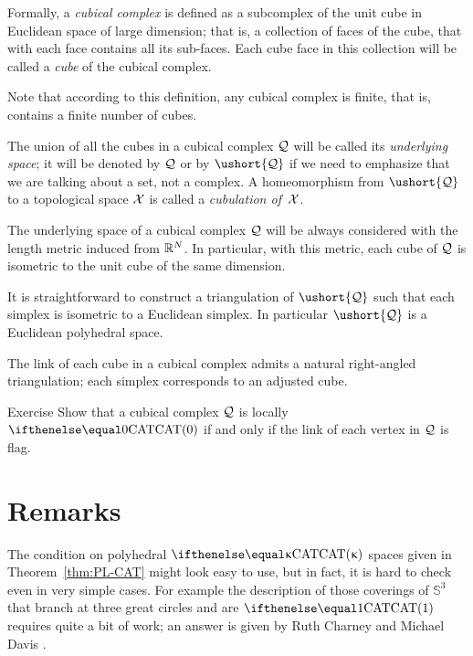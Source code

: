 Formally, a \emph{cubical complex} is defined as a subcomplex 
of the unit cube in Euclidean space of large dimension;
that is, a collection of faces of the cube, that with each face contains all its sub-faces.
Each cube face in this collection 
will be called a {}\emph{cube} of the cubical complex.

Note that according to this definition, 
any cubical complex is finite,
that is, contains a finite number of cubes.

The union of all the cubes in a cubical complex $\mathcal{Q}$ will be called its \emph{underlying space};
it will be denoted by $\mathcal{Q}$ or by $\ushort{\spc{Q}}$ 
if we need to emphasize that we are talking about a set, 
not a complex.
A homeomorphism from $\ushort{\spc{Q}}$ to a topological space $\mathcal{X}$ is called a \emph{cubulation of}~$\mathcal{X}$.

The underlying space of a cubical complex $\mathcal{Q}$ will be always considered with the length metric
induced from $\mathbb{R}^N$.
In particular, with this metric, 
each cube of $\mathcal{Q}$ is isometric to the unit cube of the same dimension.

It is straightforward to construct a triangulation 
of $\ushort{\spc{Q}}$ 
such that each simplex is isometric to a Euclidean simplex.
In particular $\ushort{\spc{Q}}$ is a Euclidean polyhedral space.

The link of each cube in a cubical complex admits a natural right-angled triangulation; 
each simplex corresponds to an adjusted cube.

\begin{thm}{Exercise}\label{ex:cubical-complex}
Show that a cubical complex $\mathcal{Q}$ is locally $\CAT0$ if and only if the link of each vertex in $\mathcal{Q}$ is flag.
\end{thm}

\section{Remarks}

The condition on polyhedral $\CAT\kappa$ spaces given in Theorem~\ref{thm:PL-CAT} might look easy to use, 
but in fact, it is hard to check even in very simple cases.
For example the description of those coverings of $\mathbb{S}^3$ that branch at three 
great circles and are $\CAT1$ requires quite a bit of work;
an answer is given by Ruth Charney and Michael Davis \cite{charney-davis-1993}.

